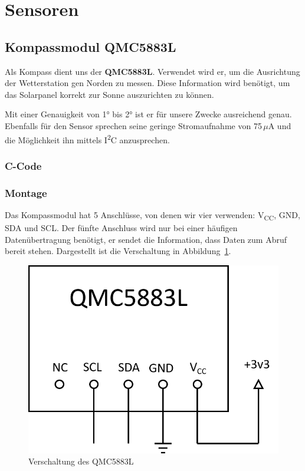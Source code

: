 \section{Sensoren}
\subsection{Kompassmodul QMC5883L}

Als Kompass dient uns der \textbf{QMC5883L}. Verwendet wird er, um die Ausrichtung der Wetterstation gen Norden zu messen. Diese Information wird benötigt, um das Solarpanel korrekt zur Sonne auszurichten zu können. 

Mit einer Genauigkeit von \ang{1} bis \ang{2} ist er für unsere Zwecke ausreichend genau. Ebenfalls für den Sensor sprechen seine geringe Stromaufnahme von 75\,$\mu$A und die Möglichkeit ihn mittels I\textsuperscript{2}C anzusprechen. 

\subsubsection{C-Code}

\subsubsection{Montage}

Das Kompassmodul hat 5 Anschlüsse, von denen wir vier verwenden: V\textsubscript{CC}, GND, SDA und SCL. Der fünfte Anschluss wird nur bei einer häufigen Datenübertragung benötigt, er sendet die Information, dass Daten zum Abruf bereit stehen. Dargestellt ist die Verschaltung in Abbildung~\ref{fig:QMC5883L_Plan}.

\begin{figure}[H]
  \centering
  \includegraphics[width=\textwidth]{./img/QMC5883L_Plan.png}
  \caption{Verschaltung des QMC5883L}\label{fig:QMC5883L_Plan}
\end{figure}

